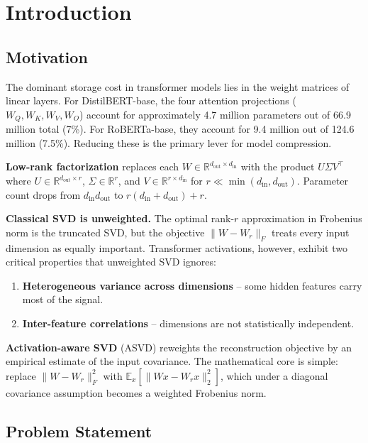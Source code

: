 
\section{Introduction}

\subsection{Motivation}

The dominant storage cost in transformer models lies in the weight matrices 
of linear layers. For DistilBERT-base, the four attention projections 
($W_Q, W_K, W_V, W_O$) account for approximately 4.7 million parameters 
out of 66.9 million total (7\%). For RoBERTa-base, they account for 
9.4 million out of 124.6 million (7.5\%). Reducing these is the primary 
lever for model compression.

\textbf{Low-rank factorization} replaces each $W \in \mathbb{R}^{d_\text{out} \times d_\text{in}}$ 
with the product $U \Sigma V^\top$ where $U \in \mathbb{R}^{d_\text{out} \times r}$, 
$\Sigma \in \mathbb{R}^r$, and $V \in \mathbb{R}^{r \times d_\text{in}}$ for 
$r \ll \min(d_\text{in}, d_\text{out})$. Parameter count drops from 
$d_\text{in} d_\text{out}$ to $r(d_\text{in} + d_\text{out}) + r$.

\textbf{Classical SVD is unweighted.} The optimal rank-$r$ approximation in 
Frobenius norm is the truncated SVD, but the objective 
$\|W - W_r\|_F$ treats every input dimension as equally important. Transformer 
activations, however, exhibit two critical properties that unweighted SVD 
ignores:

\begin{enumerate}
\item \textbf{Heterogeneous variance across dimensions} -- some hidden features
  carry most of the signal.
\item \textbf{Inter-feature correlations} -- dimensions are not statistically
  independent.

\end{enumerate}
\textbf{Activation-aware SVD} (ASVD) reweights the reconstruction objective by 
an empirical estimate of the input covariance. The mathematical core is 
simple: replace $\|W - W_r\|_F^2$ with 
$\mathbb{E}_x[\|Wx - W_r x\|_2^2]$, which under a diagonal covariance 
assumption becomes a weighted Frobenius norm.

\subsection{Problem Statement}

